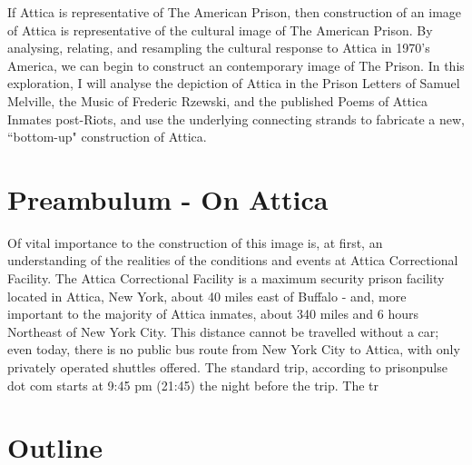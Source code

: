 \documentclass[14pt, letterpaper]{report}
\begin{document}
	If Attica is representative of The American Prison, then construction 
	of an image of Attica is representative of the cultural image of 
	The American Prison. By analysing, relating, and resampling the 
	cultural response to Attica in 1970's America, we can begin to 
	construct an contemporary image of The Prison. In this exploration, 
	I will analyse the depiction of Attica in the Prison Letters of 
	Samuel Melville, the Music of Frederic Rzewski, and the published 
	Poems of Attica Inmates post-Riots, and use the underlying connecting 
	strands to fabricate a new, ``bottom-up" construction of Attica. 
	
	\section*{Preambulum - On Attica}
	
	Of vital importance to the construction of this image is, at first, 
	an understanding of the realities of the conditions and events at 
	Attica Correctional Facility. The Attica Correctional Facility is a 
	maximum security prison facility located in Attica, New York, about 
	40 miles east of Buffalo - and, more important to the majority of 
	Attica inmates, about 340 miles and 6 hours Northeast of New York 
	City. This distance cannot be travelled without a car; even today, 
        there is no public bus route from New York City to Attica, with only 
        privately operated shuttles offered. The standard trip, according to 
        prisonpulse dot com starts at 9:45 pm (21:45) the night before the 
        trip. The tr
	
        \section*{Outline}
	
\end{document}
